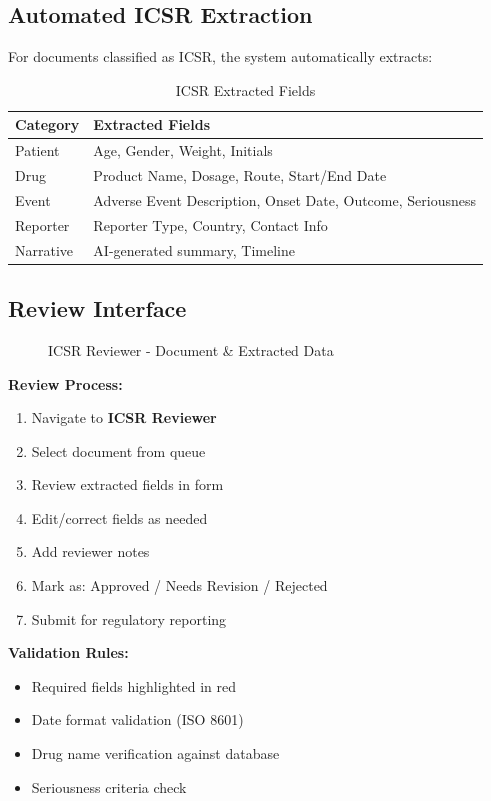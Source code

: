 \subsection{Automated ICSR Extraction}

For documents classified as ICSR, the system automatically extracts:

\begin{table}[h]
\centering
\caption{ICSR Extracted Fields}
\begin{tabularx}{\textwidth}{lX}
\toprule
\textbf{Category} & \textbf{Extracted Fields} \\
\midrule
Patient & Age, Gender, Weight, Initials \\
Drug & Product Name, Dosage, Route, Start/End Date \\
Event & Adverse Event Description, Onset Date, Outcome, Seriousness \\
Reporter & Reporter Type, Country, Contact Info \\
Narrative & AI-generated summary, Timeline \\
\bottomrule
\end{tabularx}
\end{table}

\subsection{Review Interface}

\begin{figure}[h]
\centering
{}
\caption{ICSR Reviewer - Document \& Extracted Data}
\label{fig:icsr-reviewer}
\end{figure}

\textbf{Review Process:}
\begin{enumerate}
    \item Navigate to \textbf{ICSR Reviewer}
    \item Select document from queue
    \item Review extracted fields in form
    \item Edit/correct fields as needed
    \item Add reviewer notes
    \item Mark as: Approved / Needs Revision / Rejected
    \item Submit for regulatory reporting
\end{enumerate}

\textbf{Validation Rules:}
\begin{itemize}
    \item Required fields highlighted in red
    \item Date format validation (ISO 8601)
    \item Drug name verification against database
    \item Seriousness criteria check
\end{itemize}

